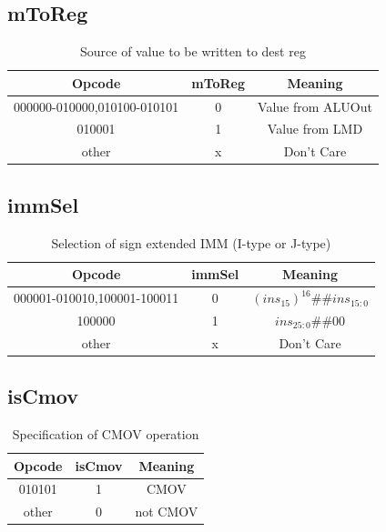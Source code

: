 \documentclass{article}
\begin{document}
\subsection{mToReg}
\begin{table}[H]
    \centering
    \begin{tabular}{|c|c|c|}
        \hline
        \textbf{Opcode} & \textbf{mToReg} & \textbf{Meaning} \\
        \hline
        000000-010000,010100-010101 & 0 & Value from ALUOut \\
        010001 & 1 & Value from LMD \\
        other & x & Don't Care \\
        \hline
    \end{tabular}
    \caption{Source of value to be written to dest reg}
\end{table}

\subsection{immSel}
\begin{table}[H]
    \centering
    \begin{tabular}{|c|c|c|}
        \hline
        \textbf{Opcode} & \textbf{immSel} & \textbf{Meaning} \\
        \hline
        000001-010010,100001-100011 & 0 & $(ins_{15})^{16}\#\#ins_{15:0}$ \\
        100000 & 1 & $ins_{25:0}\#\#00$ \\
        other & x & Don't Care \\
        \hline
    \end{tabular}
    \caption{Selection of sign extended IMM (I-type or J-type)}
\end{table}

\subsection{isCmov}
\begin{table}[H]
    \centering
    \begin{tabular}{|c|c|c|}
        \hline
        \textbf{Opcode} & \textbf{isCmov} & \textbf{Meaning} \\
        \hline
        010101 & 1 & CMOV \\
        other & 0 & not CMOV \\
        \hline
    \end{tabular}
    \caption{Specification of CMOV operation}
\end{table}
\end{document}
